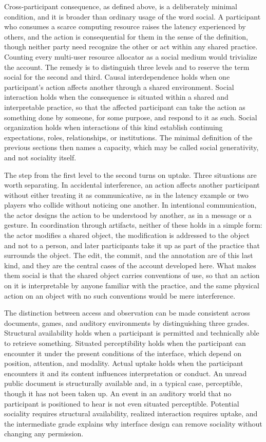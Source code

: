 \documentclass[11pt]{article}
\theoremstyle{remark}
\begin{document}
Cross-participant consequence, as defined above, is a deliberately minimal condition, and it is broader than ordinary usage of the word social. A participant who consumes a scarce computing resource raises the latency experienced by others, and the action is consequential for them in the sense of the definition, though neither party need recognize the other or act within any shared practice. Counting every multi-user resource allocator as a social medium would trivialize the account. The remedy is to distinguish three levels and to reserve the term social for the second and third. Causal interdependence holds when one participant's action affects another through a shared environment. Social interaction holds when the consequence is situated within a shared and interpretable practice, so that the affected participant can take the action as something done by someone, for some purpose, and respond to it as such. Social organization holds when interactions of this kind establish continuing expectations, roles, relationships, or institutions. The minimal definition of the previous sections then names a capacity, which may be called social generativity, and not sociality itself.

The step from the first level to the second turns on uptake. Three situations are worth separating. In accidental interference, an action affects another participant without either treating it as communicative, as in the latency example or two players who collide without noticing one another. In intentional communication, the actor designs the action to be understood by another, as in a message or a gesture. In coordination through artifacts, neither of these holds in a simple form: the actor modifies a shared object, the modification is addressed to the object and not to a person, and later participants take it up as part of the practice that surrounds the object. The edit, the commit, and the annotation are of this last kind, and they are the central cases of the account developed here. What makes them social is that the shared object carries conventions of use, so that an action on it is interpretable by anyone familiar with the practice, and the same physical action on an object with no such conventions would be mere interference.

The distinction between access and observation can be made consistent across documents, games, and auditory environments by distinguishing three grades. Structural availability holds when a participant is permitted and technically able to retrieve something. Situated perceptibility holds when the participant can encounter it under the present conditions of the interface, which depend on position, attention, and modality. Actual uptake holds when the participant encounters it and its content influences interpretation or conduct. An unread public document is structurally available and, in a typical case, perceptible, though it has not been taken up. An event in an auditory world that no participant is positioned to hear is not even situated perceptible. Potential sociality requires structural availability, realized interaction requires uptake, and the intermediate grade explains why interface design can remove sociality without changing any permission.
\end{document}
